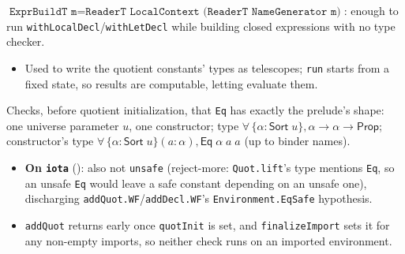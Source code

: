 \begin{definition}
\label{def:kernel-exprbuildt}
\leanok
{}
 $\texttt{ExprBuildT m} = \texttt{ReaderT LocalContext (ReaderT NameGenerator m)}$:
enough to run \texttt{withLocalDecl}/\texttt{withLetDecl} while building closed expressions with
no type checker.
\begin{itemize}
\item Used to write the quotient constants' types as telescopes; \texttt{run} starts from a fixed
state, so results are computable, letting
 evaluate them.
\end{itemize}
\end{definition}

\begin{definition}
\label{def:kernel-check-eq-type}
 
\leanok
{}

 Checks, before quotient initialization, that \texttt{Eq} has exactly the
prelude's shape: one universe parameter $u$, one constructor; type
$\forall\,\{\alpha:\mathsf{Sort}\;u\},\alpha\to\alpha\to\mathsf{Prop}$; constructor's type
$\forall\,\{\alpha:\mathsf{Sort}\;u\}(a:\alpha),\mathsf{Eq}\;\alpha\;a\;a$ (up to binder names).
\begin{itemize}
\item \textbf{On \texttt{iota}} (): also not \texttt{unsafe}
(reject-more: \texttt{Quot.lift}'s type mentions \texttt{Eq}, so an unsafe \texttt{Eq} would leave
a safe constant depending on an unsafe one), discharging \texttt{addQuot.WF}/\texttt{addDecl.WF}'s
\texttt{Environment.EqSafe} hypothesis.
\item {} \texttt{addQuot} returns early once \texttt{quotInit} is set, and
\texttt{finalizeImport} sets it for any non-empty imports, so neither check runs on an imported
environment.
\end{itemize}
\end{definition}

